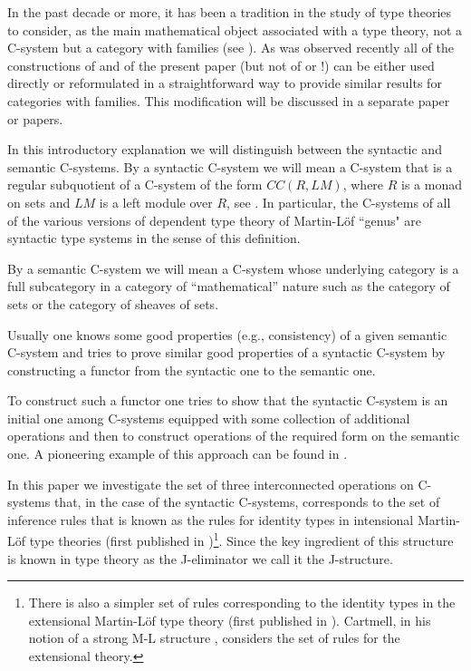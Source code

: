 \documentclass[12pt]{article}
\numberwithin{equation}{section}
\newcommand{\toCC}{CC} %
\begin{document}
In the past decade or more, it has been a tradition in the study of type
theories to consider, as the main mathematical object associated with a type
theory, not a C-system but a category with families (see \cite{Dybjer}). As was
observed recently all of the constructions of \cite{Cfromauniverse,fromunivwithPiI,presheavesOb,fromunivwithPiII}
and of the present paper (but not of \cite{Csubsystems}
or \cite{Cofamodule}!) can be either used directly or reformulated in a
straightforward way to provide similar results for categories with
families. This modification will be discussed in a separate paper or papers.

In this introductory explanation we will distinguish between the syntactic and
semantic C-systems. By a syntactic C-system we will mean a C-system that is a
regular subquotient of a C-system of the form $\toCC(R,LM)$, where $R$ is a monad
on sets and $LM$ is a left module over $R$, see \cite{Cofamodule,Csubsystems}.
In particular, the C-systems of all of the various versions
of dependent type theory of Martin-L\"of ``genus" are syntactic type systems in
the sense of this definition.

By a semantic C-system we will mean a C-system whose underlying category is a
full subcategory in a category of ``mathematical'' nature such as the category
of sets or the category of sheaves of sets.

Usually one knows some good properties (e.g., consistency) of a given semantic
C-system and tries to prove similar good properties of a syntactic C-system by
constructing a functor from the syntactic one to the semantic one.

To construct such a functor one tries to show that the syntactic C-system is an
initial one among C-systems equipped with some collection of additional
operations and then to construct operations of the required form on the
semantic one. A pioneering example of this approach can be found in
\cite{Streicher}.

In this paper we investigate the set of three interconnected operations on
C-systems that, in the case of the syntactic C-systems, corresponds to the set
of inference rules that is known as the rules for identity types in intensional
Martin-L\"of type theories (first published in \cite{MLTT73})\footnote{There is
  also a simpler set of rules corresponding to the identity types in the
  extensional Martin-L\"of type theory (first published in
  \cite{MLTT79}). Cartmell, in his notion of a strong M-L structure
  \cite[p.3.36]{Cartmell0}, considers the set of rules for the extensional
  theory.}. Since the key ingredient of this structure is known in type theory
as the J-eliminator we call it the J-structure.
\end{document}
